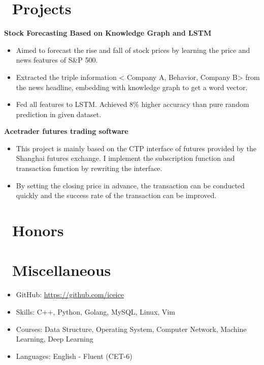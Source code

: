 \documentclass{resume}
\begin{document}
\section{\faArchive \ Projects}
\textbf{Stock Forecasting Based on Knowledge Graph and LSTM}
\begin{itemize}
  \item Aimed to forecast the rise and fall of stock prices by learning the price and news features of S\&P 500.
  \item Extracted the triple information < Company A, Behavior, Company B> from the news headline, embedding with knowledge graph to get a word vector.
  \item Fed all features to LSTM. Achieved 8\% higher accuracy than pure random prediction in given dataset.
\end{itemize}
\textbf{Acetrader futures trading software}
\begin{itemize}
  \item This project is mainly based on the CTP interface of futures provided by the Shanghai futures exchange. I implement the subscription function and transaction function by rewriting the interface.  
  \item By setting the closing price in advance, the transaction can be conducted quickly and the success rate of the transaction can be improved.
\end{itemize}

\section{\ Honors}

\section{\ Miscellaneous}
\begin{itemize}[parsep=0.5ex]
  \item GitHub: \href{https://github.com/iceice}{https://github.com/iceice}
  \item Skills: C++, Python, Golang, MySQL, Linux, Vim
  \item Courses: Data Structure, Operating System, Computer Network, Machine Learning, Deep Learning
  \item Languages: English - Fluent (CET-6)
\end{itemize}

%
%
\end{document}
